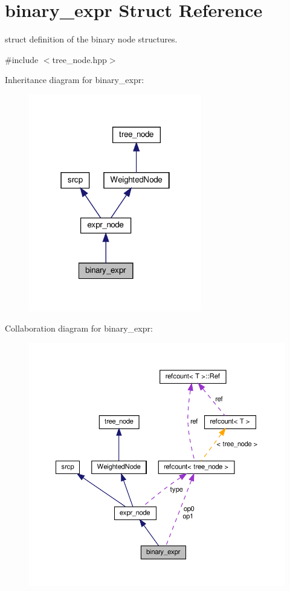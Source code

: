 \hypertarget{structbinary__expr}{}\section{binary\+\_\+expr Struct Reference}
\label{structbinary__expr}


struct definition of the binary node structures.  




{\ttfamily \#include $<$tree\+\_\+node.\+hpp$>$}



Inheritance diagram for binary\+\_\+expr\+:
\nopagebreak
\begin{figure}[H]
\begin{center}
\leavevmode
\includegraphics[width=214pt]{da/d64/structbinary__expr__inherit__graph}
\end{center}
\end{figure}


Collaboration diagram for binary\+\_\+expr\+:
\nopagebreak
\begin{figure}[H]
\begin{center}
\leavevmode
\includegraphics[width=350pt]{d0/ddc/structbinary__expr__coll__graph}
\end{center}
\end{figure}

